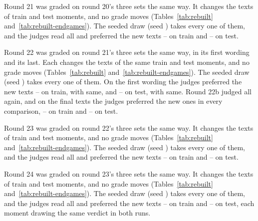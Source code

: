 \documentclass[11pt]{article}
\begin{document}
Round 21 was graded on round 20's three sets the same way. It changes the texts of
\RoundTwentyOneChangedTrain{} train and \RoundTwentyOneChangedTest{} test moments, and no grade
moves (Tables~\ref{tab:rebuilt} and~\ref{tab:rebuilt-endgames}). The seeded draw (seed \RoundTwentyOneSeed) takes every one of
them, and the judges read all \RoundTwentyOneJudged{} and preferred the new texts
\RoundTwentyOneTrainNew--\RoundTwentyOneTrainOld{} on train and
\RoundTwentyOneTestNew--\RoundTwentyOneTestOld{} on test.

Round 22 was graded on round 21's three sets the same way, in its first wording and its last. Each
changes the texts of the same \RoundTwentyTwoChangedTrain{} train and \RoundTwentyTwoChangedTest{}
test moments, and no grade moves (Tables~\ref{tab:rebuilt} and~\ref{tab:rebuilt-endgames}). The seeded draw (seed
\RoundTwentyTwoSeed) takes every one of them. On the first wording the judges preferred the new
texts \RoundTwentyTwoFirstTrainNew--\RoundTwentyTwoFirstTrainOld{} on train, with
\RoundTwentyTwoFirstTrainSame{} same, and \RoundTwentyTwoFirstTestNew--\RoundTwentyTwoFirstTestOld{}
on test, with \RoundTwentyTwoFirstTestSame{} same. Round 22b judged all \RoundTwentyTwoRejudged{}
again, and on the final texts the judges preferred the new ones in every comparison,
\RoundTwentyTwoTrainNew--\RoundTwentyTwoTrainOld{} on train and
\RoundTwentyTwoTestNew--\RoundTwentyTwoTestOld{} on test.

Round 23 was graded on round 22's three sets the same way. It changes the texts of
\RoundTwentyThreeChangedTrain{} train and \RoundTwentyThreeChangedTest{} test moments, and no grade
moves (Tables~\ref{tab:rebuilt} and~\ref{tab:rebuilt-endgames}). The seeded draw (seed
\RoundTwentyThreeSeed) takes every one of them, and the judges read all \RoundTwentyThreeJudged{}
and preferred the new texts \RoundTwentyThreeTrainNew--\RoundTwentyThreeTrainOld{} on train and
\RoundTwentyThreeTestNew--\RoundTwentyThreeTestOld{} on test.

Round 24 was graded on round 23's three sets the same way. It changes the texts of
\RoundTwentyFourChangedTrain{} train and \RoundTwentyFourChangedTest{} test moments, and no grade
moves (Tables~\ref{tab:rebuilt} and~\ref{tab:rebuilt-endgames}). The seeded draw (seed
\RoundTwentyFourSeed) takes every one of them, and the judges read all \RoundTwentyFourJudged{}
and preferred the new texts \RoundTwentyFourTrainNew--\RoundTwentyFourTrainOld{} on train and
\RoundTwentyFourTestNew--\RoundTwentyFourTestOld{} on test, each moment drawing the same verdict
in both runs.
\end{document}
